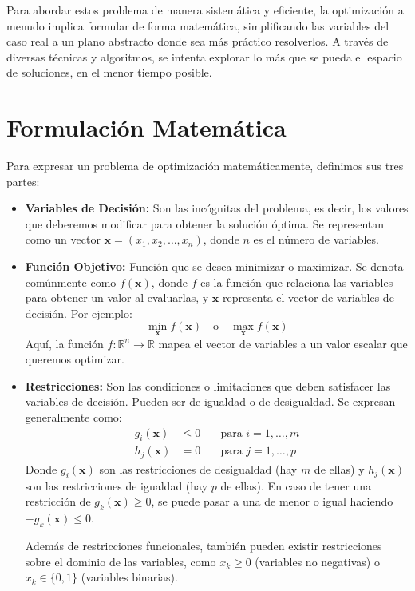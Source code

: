 \documentclass[12pt,a4paper]{book}
\begin{document}
Para abordar estos problema de manera sistemática y eficiente, la optimización a menudo implica formular de forma matemática, simplificando las variables del caso real a un plano abstracto donde sea más práctico resolverlos. A través de diversas técnicas y algoritmos, se intenta explorar lo más que se pueda el espacio de soluciones, en el menor tiempo posible.

\section{Formulación Matemática}

Para expresar un problema de optimización matemáticamente, definimos sus tres partes:

\begin{itemize}
    \item \textbf{Variables de Decisión:} Son las incógnitas del problema, es decir, los valores que deberemos modificar para obtener la solución óptima. Se representan como un vector $\mathbf{x} = (x_1, x_2, \ldots, x_n)$, donde $n$ es el número de variables.

    \item \textbf{Función Objetivo:} Función que se desea minimizar o maximizar. Se denota comúnmente como $f(\mathbf{x})$, donde $f$ es la función que relaciona las variables para obtener un valor al evaluarlas, y $\mathbf{x}$ representa el vector de variables de decisión. Por ejemplo:
    $$ \min_{\mathbf{x}} f(\mathbf{x}) \quad \text{o} \quad \max_{\mathbf{x}} f(\mathbf{x}) $$
    Aquí, la función $f: \mathbb{R}^n \to \mathbb{R}$ mapea el vector de variables a un valor escalar que queremos optimizar.

    \item \textbf{Restricciones:} Son las condiciones o limitaciones que deben satisfacer las variables de decisión. Pueden ser de igualdad o de desigualdad. Se expresan generalmente como:
    \begin{align*}
        g_i(\mathbf{x}) &\le 0 & \quad \text{para } i = 1, \ldots, m \\
        h_j(\mathbf{x}) &= 0 & \quad \text{para } j = 1, \ldots, p
    \end{align*}
    Donde $g_i(\mathbf{x})$ son las restricciones de desigualdad (hay $m$ de ellas) y $h_j(\mathbf{x})$ son las restricciones de igualdad (hay $p$ de ellas).
    En caso de tener una restricción de $g_k(\mathbf{x})\geq0$, se puede pasar a una de menor o igual haciendo $-g_k(\mathbf{x})\leq0$.
    
    Además de restricciones funcionales, también pueden existir restricciones sobre el dominio de las variables, como $x_k \ge 0$ (variables no negativas) o $x_k \in \{0,1\}$ (variables binarias).
\end{itemize}
\end{document}
